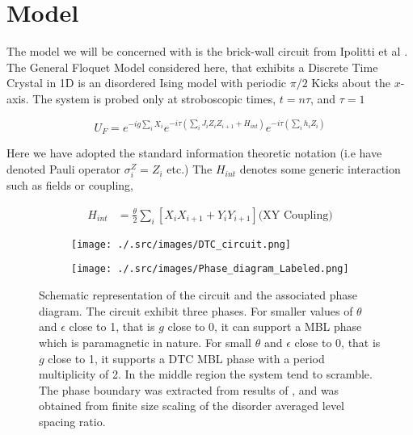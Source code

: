 \section{Model}

The model we will be concerned with is the brick-wall circuit from Ipolitti et al \cite{Khemani2021DTCinNISQ,ippolitti2022time}. The General Floquet Model considered here, that exhibits a Discrete Time Crystal in 1D is an disordered Ising model with periodic $\pi/2$ Kicks about the $x$-axis. The system is probed only at stroboscopic times, $t=n \tau$, and $\tau=1$

\begin{equation}
    U_F= e^{-ig\sum_i X_i}e^{-i\tau(\sum_{i} J_{i} Z_i Z_{i+1}+H_{int})}e^{-i\tau(\sum_{i} h_{i} Z_i)}
\end{equation}

Here we have adopted the standard information theoretic notation (i.e have denoted Pauli operator $\sigma^Z_i=Z_i$ etc.) The $H_{int}$ denotes some generic interaction such as fields or coupling, 

\begin{equation*}
\begin{split}
    H_{int}&=  \frac{\theta}{2}\sum_{i}[X_iX_{i+1}+Y_iY_{i+1}] \text{(XY Coupling)}
\end{split}
\end{equation*}


\begin{figure}[h]
\begin{subfigure}{0.59\textwidth}
\texttt{[image: ./.src/images/DTC\_circuit.png]} 
\label{fig:subim2a}
\end{subfigure}
\begin{subfigure}{0.39\textwidth}
\texttt{[image: ./.src/images/Phase\_diagram\_Labeled.png]} 
\label{fig:subim2a}
\end{subfigure}
\caption{Schematic representation of the circuit and the associated phase diagram. The circuit exhibit three phases. For smaller values of $\theta$ and $\epsilon$ close to 1, that is $g$ close to 0, it can support a MBL phase which is paramagnetic in nature. For small $\theta$ and $\epsilon$ close to 0, that is $g$ close to 1, it supports a DTC MBL phase with a period multiplicity of 2. In the middle region the system tend to scramble. The phase boundary was extracted from results of \cite{Khemani2021DTCinNISQ}, and was obtained from finite size scaling of the disorder averaged level spacing ratio.} 
\end{figure}

